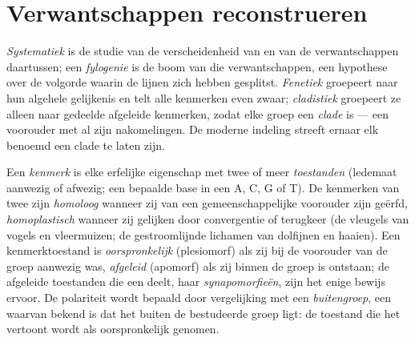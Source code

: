 \section{Verwantschappen reconstrueren}

\begin{definition}\label{def:b1:classifying-biodiversity:systematics}
\emph{Systematiek} is de studie van de verscheidenheid van  en van
de verwantschappen daartussen; een \emph{fylogenie} is de boom van die
verwantschappen, een hypothese over de volgorde waarin de lijnen zich hebben
gesplitst. \emph{Fenetiek} groepeert  naar hun algehele
gelijkenis en telt alle kenmerken even zwaar; \emph{cladistiek} groepeert ze
alleen naar gedeelde afgeleide kenmerken, zodat elke groep een \emph{clade}
is --- een voorouder met al zijn nakomelingen. De moderne indeling streeft
ernaar elk benoemd  een clade te laten zijn.
\end{definition}

\begin{definition}\label{def:b1:classifying-biodiversity:characters}
Een \emph{kenmerk} is elke erfelijke eigenschap met twee of meer
\emph{toestanden} (ledemaat aanwezig of afwezig; een bepaalde base in een 
A, C, G of T). De kenmerken van twee  zijn \emph{homoloog} wanneer
zij van een gemeenschappelijke voorouder zijn geërfd, \emph{homoplastisch}
wanneer zij gelijken door convergentie of terugkeer (de vleugels van vogels
en vleermuizen; de gestroomlijnde lichamen van dolfijnen en haaien). Een
kenmerktoestand is \emph{oorspronkelijk} (plesiomorf) als zij bij de
voorouder van de groep aanwezig was, \emph{afgeleid} (apomorf) als zij binnen
de groep is ontstaan; de afgeleide toestanden die een  deelt, haar
\emph{synapomorfieën}, zijn het enige bewijs ervoor. De polariteit wordt
bepaald door vergelijking met een \emph{buitengroep}, een  waarvan
bekend is dat het buiten de bestudeerde groep ligt: de toestand die het
vertoont wordt als oorspronkelijk genomen.
\end{definition}

